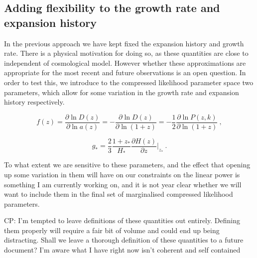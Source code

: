 \documentclass[preprintnumbers,prd,superscriptaddress,notitlepage,nofootinbib] {revtex4-1}
\newcommand{\CP}[1]{{\color{red}CP: #1}}
\begin{document}
\subsection{Adding flexibility to the growth rate and expansion history}
\label{ss:extensions}
In the previous approach we have kept fixed the expansion history and growth rate.
There is a physical motivation for doing so, as these quantities are close to
independent of cosmological model. However whether these approximations are appropriate
for the most recent and future observations is an open question. In order to test this,
we introduce to the compressed likelihood parameter space two parameters, which allow for
some variation in the growth rate and expansion history respectively.

\begin{equation}
    f(z) = \frac{\partial \ln D(z)}{\partial \ln a(z)}
     = - \frac{\partial \ln D(z)}{\partial \ln (1+z)}
     = - \frac{1}{2} \frac{\partial \ln P(z,k)}{\partial \ln (1+z)} ~,
\end{equation}

\begin{equation}
    g_\ast = \frac{2}{3} \frac{1+z_\ast}{H_\ast} 
         \frac{\partial H(z)}{\partial z} \Bigr\rvert_{z_\ast} ~.
\end{equation}

To what extent we are sensitive to these parameters, and the effect that opening
up some variation in them will have on our constraints on the linear power is
something I am currently working on, and it is not year clear whether we will
want to include them in the final set of marginalised compressed likelihood
parameters.

\CP{I'm tempted to leave definitions of these quantities out entirely.
Defining them properly will require a fair bit of volume and could end
up being distracting. Shall we leave a thorough definition of these
quantities to a future document? I'm aware what I have right now
isn't coherent and self contained}



\end{document}
